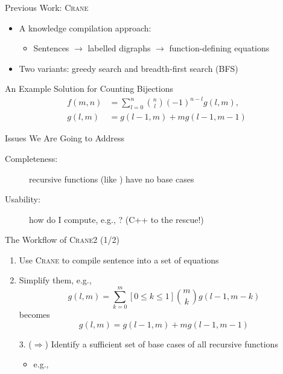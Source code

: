 \documentclass{beamer}
\begin{document}
\begin{frame}{Previous Work:
    \textsc{Crane}~\textcolor{gray}{\parencite{DBLP:conf/kr/DilkasB23}}}
  \begin{itemize}
    \item A knowledge compilation approach:
          \begin{itemize}
            \item \alert{Sentences} $\to$ labelled \alert{digraphs} $\to$
                  function-defining \alert{equations}
          \end{itemize}
    \item Two variants: \alert{greedy} search and \alert{breadth-first} search
          (BFS)
  \end{itemize}
  \pause
  \begin{exampleblock}{An Example Solution for Counting Bijections}
    \begin{align*}
      f(m, n) &= \sum_{l=0}^{n} \binom{n}{l}{(-1)}^{n-l}g(l, m),\\
      g(l, m) &= g(l-1, m) + mg(l-1, m-1)
    \end{align*}
  \end{exampleblock}
  \pause
  \begin{alertblock}{Issues We Are Going to Address}
    \begin{description}
      \item[Completeness:] recursive functions (like ) have
            \alert{no base cases}
      \item[Usability:] how do I compute, e.g., ? \hfill
            \textcolor{mygreen}{(C++ to the rescue!)}
    \end{description}
  \end{alertblock}
\end{frame}

\begin{frame}{The Workflow of \textsc{Crane2} (1/2)}
  \begin{enumerate}
    \item Use \alert{\textsc{Crane}} to compile sentence \structure{$\phi$} into
          a set of equations  \pause
    \item Simplify them, e.g.,
          \[
            g(l, m) = \sum_{k=0}^{m}[0 \le k \le 1]\binom{m}{k}g(l-1, m-k)
          \]
          becomes
          \[
            g(l, m) = g(l-1, m) + mg(l-1, m-1)
          \] \pause
    \item[3. ($\Rightarrow$)] Identify a \alert{sufficient set of base cases} of
          all recursive functions
          \begin{itemize}
            \item e.g., 
          \end{itemize}
  \end{enumerate}
\end{frame}
\end{document}
